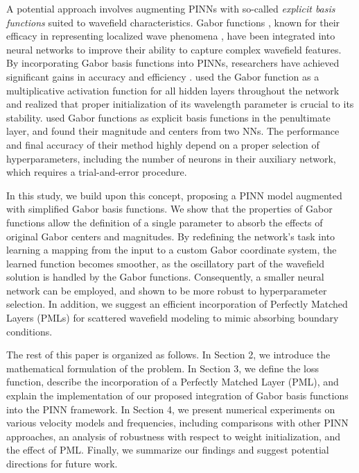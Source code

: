 \documentclass[authoryear, preprint, 12pt]{elsarticle}
\begin{document}
A potential approach involves augmenting PINNs with so-called \textit{explicit basis functions} suited to wavefield characteristics. Gabor functions \citep{gabor1946}, known for their efficacy in representing localized wave phenomena \citep{pinto2014}, have been integrated into neural networks to improve their ability to capture complex wavefield features. By incorporating Gabor basis functions into PINNs, researchers have achieved significant gains in accuracy and efficiency \citep{huang2023b, Alkhalifah2024}. \cite{huang2023b} used the Gabor function as a multiplicative activation function for all hidden layers throughout the network and realized that proper initialization of its wavelength parameter is crucial to its stability. \cite{Alkhalifah2024} used Gabor functions as explicit basis functions in the penultimate layer, and found their magnitude and centers from two NNs. The performance and final accuracy of their method highly depend on a proper selection of hyperparameters, including the number of neurons in their auxiliary network, which requires a trial-and-error procedure.

In this study, we build upon this concept, proposing a PINN model augmented with simplified Gabor basis functions. We show that the properties of Gabor functions allow the definition of a single parameter to absorb the effects of original Gabor centers and magnitudes. By redefining the network’s task into learning a mapping from the input to a custom Gabor coordinate system, the learned function becomes smoother, as the oscillatory part of the wavefield solution is handled by the Gabor functions. Consequently, a smaller neural network can be employed, and shown to be more robust to hyperparameter selection. In addition, we suggest an efficient incorporation of Perfectly Matched Layers (PMLs) for scattered wavefield modeling to mimic absorbing boundary conditions.

The rest of this paper is organized as follows. In Section 2, we introduce the mathematical formulation of the problem. In Section 3, we define the loss function, describe the incorporation of a Perfectly Matched Layer (PML), and explain the implementation of our proposed integration of Gabor basis functions into the PINN framework. In Section 4, we present numerical experiments on various velocity models and frequencies, including comparisons with other PINN approaches, an analysis of robustness with respect to weight initialization, and the effect of PML. Finally, we summarize our findings and suggest potential directions for future work.
\end{document}
